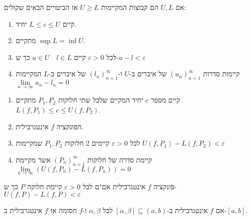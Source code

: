 \documentclass{tstextbook}
\begin{document}
\begin{proposition}
אם \(U,L\) הם קבוצות המקיימות \(U\geq L\) אז הביטויים הבאים שקולים: 

  \begin{enumerate}
    \item קיים \(L\leq c\leq U\) יחיד. 


    \item מתקיים \(\sup L = \inf U\). 


    \item לכל \(\varepsilon>0\) קיים \(u\in U\quad l\in L\) כך ש-\(u-l<\varepsilon\)


    \item קיימות סדרות \((u_n)_{n=1}^{\infty}\) של איברים ב-\(U\) ו-\((l_n)_{n=1}^\infty\) של איברים ב-\(L\) המקיימות \(\underset{n\rightarrow\infty}{\lim }u_n - l_n = 0\)


  \end{enumerate}
\end{proposition}
\begin{proposition}
  \begin{enumerate}
    \item קיים מספר \(c\) יחיד המקיים שלכל שתי חלוקות \(P_1,P_2\) מתקיים \(L(f,P_1)\leq c \leq U(f,P_2)\). 


    \item הפונקציה \(f\) אינטגרבילית. 


    \item לכל \(\varepsilon>0\) קיימים 2 חלוקות \(P_1, P_2\) שמקיימות \(U(f,P_1)-L(f,P_2)<\varepsilon\)


    \item קיימת סדרה של חלוקות \((P_n)_{n=1}^{\infty}\) אשר מקיימת  \(\underset{n\rightarrow \infty}{\lim} \left( U(f,P_n) - L(f,P_n)\right) = 0\)


  \end{enumerate}
\end{proposition}
\begin{proposition}
פונקציה \(f\) אינטגרבילית אם"ם לכל \(\varepsilon>0\) קיימת חלוקה \(P\) כך ש- \(U(f,P)-L(f,P)<\varepsilon\)

\end{proposition}
\begin{proposition}
אם \(f\) אינטגרבילית ב-\(\left[ \alpha,\beta \right]\subseteq(a,b)\) לכל \(\alpha,\beta\) ו-\(f\) חסומה אז \(f\) אינטגרבילית ב-\([a,b]\).

\end{proposition}
\end{document}
